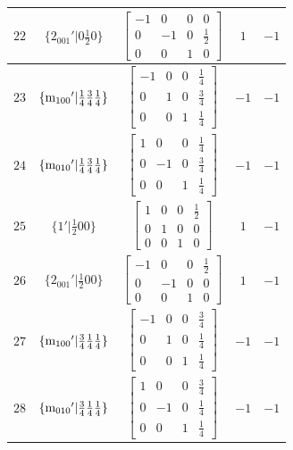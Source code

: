 \documentclass[fleqn,8pt]{jsarticle}
\begin{document}
\begin{longtable}{ccccc}
$ 22 $ & $ \{2{}_{001}{}'|0 \frac{1}{2} 0\} $ & $ \begin{bmatrix} -1 & 0 & 0 & 0 \\ 0 & -1 & 0 & \frac{1}{2} \\ 0 & 0 & 1 & 0 \end{bmatrix} $ & $ 1 $ & $ -1 $ \\ \hline
$ 23 $ & $ \{{\rm m}_{100}{}'|\frac{1}{4} \frac{3}{4} \frac{1}{4}\} $ & $ \begin{bmatrix} -1 & 0 & 0 & \frac{1}{4} \\ 0 & 1 & 0 & \frac{3}{4} \\ 0 & 0 & 1 & \frac{1}{4} \end{bmatrix} $ & $ -1 $ & $ -1 $ \\ \hline
$ 24 $ & $ \{{\rm m}_{010}{}'|\frac{1}{4} \frac{3}{4} \frac{1}{4}\} $ & $ \begin{bmatrix} 1 & 0 & 0 & \frac{1}{4} \\ 0 & -1 & 0 & \frac{3}{4} \\ 0 & 0 & 1 & \frac{1}{4} \end{bmatrix} $ & $ -1 $ & $ -1 $ \\ \hline
$ 25 $ & $ \{1{}'|\frac{1}{2} 0 0\} $ & $ \begin{bmatrix} 1 & 0 & 0 & \frac{1}{2} \\ 0 & 1 & 0 & 0 \\ 0 & 0 & 1 & 0 \end{bmatrix} $ & $ 1 $ & $ -1 $ \\ \hline
$ 26 $ & $ \{2{}_{001}{}'|\frac{1}{2} 0 0\} $ & $ \begin{bmatrix} -1 & 0 & 0 & \frac{1}{2} \\ 0 & -1 & 0 & 0 \\ 0 & 0 & 1 & 0 \end{bmatrix} $ & $ 1 $ & $ -1 $ \\ \hline
$ 27 $ & $ \{{\rm m}_{100}{}'|\frac{3}{4} \frac{1}{4} \frac{1}{4}\} $ & $ \begin{bmatrix} -1 & 0 & 0 & \frac{3}{4} \\ 0 & 1 & 0 & \frac{1}{4} \\ 0 & 0 & 1 & \frac{1}{4} \end{bmatrix} $ & $ -1 $ & $ -1 $ \\ \hline
$ 28 $ & $ \{{\rm m}_{010}{}'|\frac{3}{4} \frac{1}{4} \frac{1}{4}\} $ & $ \begin{bmatrix} 1 & 0 & 0 & \frac{3}{4} \\ 0 & -1 & 0 & \frac{1}{4} \\ 0 & 0 & 1 & \frac{1}{4} \end{bmatrix} $ & $ -1 $ & $ -1 $ \\ \hline

\end{longtable}
\end{document}
